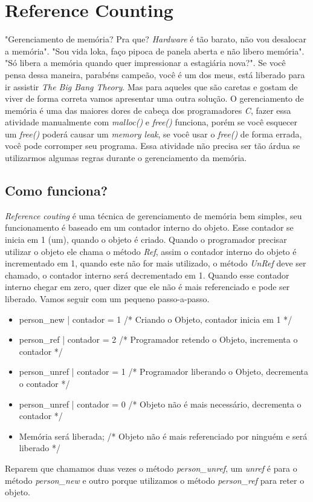 

\chapter{Reference Counting}

"Gerenciamento de memória? Pra que? \textit{Hardware} é tão barato, não vou desalocar a memória". "Sou vida loka, faço pipoca de panela aberta e não libero memória".
"Só libera a memória quando quer impressionar a estagiária nova?". Se você pensa dessa maneira, parabéns campeão, você é um dos meus, 
está liberado para ir assistir \textit{The Big Bang Theory}. Mas para aqueles que são caretas e gostam de viver de forma correta vamos apresentar uma outra solução.
O gerenciamento de memória é uma das maiores dores de cabeça dos programadores \textit{C}, fazer essa atividade manualmente com 
\textit{malloc()} e \textit{free()} funciona, porém se você esquecer um \textit{free()} poderá causar um \textit{memory leak}, se você usar o \textit{free()} de 
forma errada, você pode corromper seu programa. Essa atividade não precisa ser tão árdua se utilizarmos algumas regras durante o gerenciamento da memória.


\section{Como funciona?}
\textit{Reference couting} é uma técnica de gerenciamento de memória bem simples, seu funcionamento é baseado em um contador interno 
do objeto. Esse contador se inicia em 1 (um), quando o objeto é criado. Quando o programador precisar utilizar o objeto ele chama o método
\textit{Ref}, assim o contador interno do objeto é incrementado em 1, quando este não for mais utilizado, o método \textit{UnRef}
deve ser chamado, o contador interno será decrementado em 1. Quando esse contador interno chegar em zero, quer dizer que ele não 
é mais referenciado e pode ser liberado. Vamos seguir com um pequeno passo-a-passo.

\vspace{5 mm}

\begin{itemize}
  \item person\_new   | contador = 1  /* Criando o Objeto, contador inicia em 1 */
  \item person\_ref   | contador = 2  /* Programador retendo o Objeto, incrementa o contador */
  \item person\_unref | contador = 1  /* Programador liberando o Objeto, decrementa o contador */
  \item person\_unref | contador = 0  /* Objeto não é mais necessário, decrementa o contador */
  \item Memória será liberada;        /* Objeto não é mais referenciado por ninguém e será liberado */
\end{itemize}
\vspace{5 mm}
Reparem que chamamos duas vezes o método \textit{person\_unref}, um \textit{unref} é para o método \textit{person\_new} e outro porque utilizamos o método \textit{person\_ref} para reter
o objeto.


